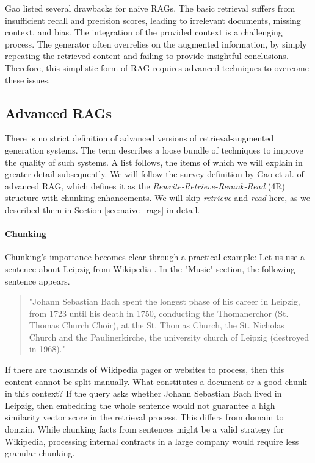 Gao \cite{Gao.18.12.2023} listed several drawbacks for naive RAGs. The basic retrieval suffers from insufficient recall and precision scores, leading to irrelevant documents, missing context, and bias. The integration of the provided context is a challenging process. The generator often overrelies on the augmented information, by simply repeating the retrieved content and failing to provide insightful conclusions. Therefore, this simplistic form of RAG requires advanced techniques to overcome these issues.

\subsection{Advanced RAGs}
\label{sec:advanced_rags}

There is no strict definition of advanced versions of retrieval-augmented generation systems. The term describes a loose bundle of techniques to improve the quality of such systems. A list follows, the items of which we will explain in greater detail subsequently. We will follow the survey definition by Gao et al. \cite{Gao.18.12.2023} of advanced RAG, which defines it as the \textit{Rewrite-Retrieve-Rerank-Read} (4R) structure with chunking enhancements. We will skip \textit{retrieve} and \textit{read} here, as we described them in Section \ref{sec:naive_rags} in detail.

\paragraph{Chunking}
\label{sec:chunk}
Chunking's importance becomes clear through a practical example: Let us use a sentence about Leipzig from Wikipedia \cite{LeipzigWikipedia.2025}. In the "Music" section, the following sentence appears.

\begin{quote}
    "Johann Sebastian Bach spent the longest phase of his career in Leipzig, from 1723 until his death in 1750, conducting the Thomanerchor (St. Thomas Church Choir), at the St. Thomas Church, the St. Nicholas Church and the Paulinerkirche, the university church of Leipzig (destroyed in 1968)."
\end{quote}

If there are thousands of Wikipedia pages or websites to process, then this content cannot be split manually. What constitutes a document or a good chunk in this context? If the query asks whether Johann Sebastian Bach lived in Leipzig, then embedding the whole sentence would not guarantee a high similarity vector score in the retrieval process. This differs from domain to domain. While chunking facts from sentences might be a valid strategy for Wikipedia, processing internal contracts in a large company would require less granular chunking.

